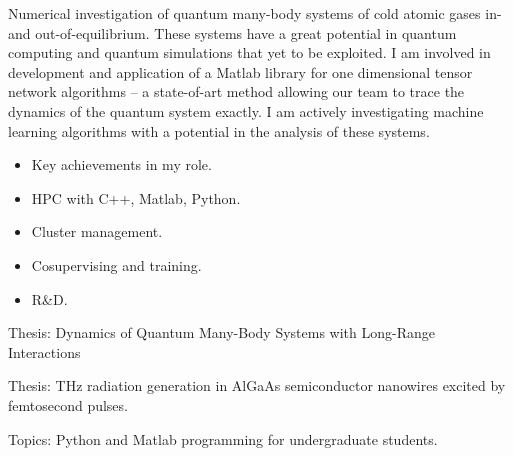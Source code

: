 \documentclass[10pt,a4paper,ragged2e,withhyper]{altacv}
\begin{document}
\begin{paracol}{2}
\divider


Numerical investigation of quantum many-body systems of cold atomic gases in- and out-of-equilibrium.
These systems have a great potential in quantum computing and quantum simulations that yet to be exploited.
I am involved in development and application of a Matlab library for one dimensional tensor network
algorithms – a state-of-art method allowing our team to trace the dynamics of the quantum system exactly.
I am actively investigating machine learning algorithms with a potential in the analysis of these systems.

\begin{itemize}
    \item Key achievements in my role.
    \item HPC with C++, Matlab, Python.
    \item Cluster management.
    \item Cosupervising and training.
    \item R\&D.
\end{itemize}


Thesis: Dynamics of Quantum Many-Body Systems with Long-Range Interactions

\divider


\divider

Thesis: THz radiation generation in AlGaAs semiconductor nanowires excited by femtosecond pulses.


Topics: Python and Matlab programming for undergraduate students.

\divider


\end{paracol}
\end{document}

